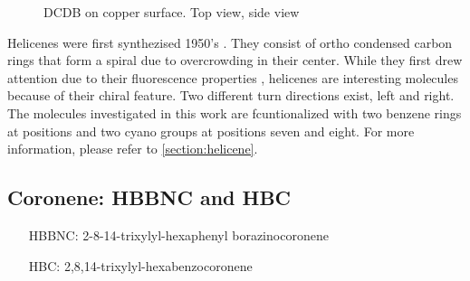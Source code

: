 \begin{figure}[]
	\centering
	 \quad
	 \quad
	\caption{DCDB on copper surface.  Top view,  side view}
	\label{fig:helicene}
\end{figure}

Helicenes were first synthezised 1950's \cite{newman_synthesis_1956}. They consist of ortho condensed carbon rings that form a spiral due to overcrowding in their center. While they first drew attention due to their fluorescence properties \cite{vander_donckt_fluorescence_1968}, helicenes are interesting molecules because of their chiral feature. Two different turn directions exist, left and right. The molecules investigated in this work are fcuntionalized with two benzene rings at positions \underline{\qquad} and two cyano groups at positions seven and eight. For more information, please refer to \autoref{section:helicene}.

\subsection{Coronene: HBBNC and HBC}
\label{sec:hbc}
\begin{itemize}
	\item[HBBNC:] 2-8-14-trixylyl-hexaphenyl borazinocoronene
	\item[HBC:] 2,8,14-trixylyl-hexabenzocoronene	
\end{itemize}

